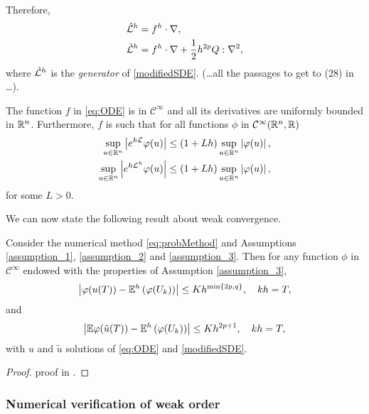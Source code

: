 Therefore,
\begin{equation}
\begin{aligned}
	\hat {\mathcal{L}}^h &= f^h \cdot \nabla, \\
	\tilde {\mathcal{L}}^h &= f^h \cdot \nabla + \frac{1}{2} h^{2p} Q : \nabla^2,
\end{aligned}
\end{equation}
where $\tilde {\mathcal{L}}^h$ is the \textit{generator} of \eqref{modifiedSDE}. (\ldots all the passages to get to (28) in \cite{CGS16} \ldots).
\begin{assumption} \label{assumption_3}The function $f$ in \eqref{eq:ODE} is in $\mathcal C^\infty$ and all its derivatives are uniformly bounded in $\mathbb{R}^n$. Furthermore, $f$ is such that for all functions $\phi$ in $\mathcal C ^\infty(\mathbb{R}^n, \mathbb{R})$ 
\begin{equation}
\begin{aligned}
	\sup_{u\in\mathbb{R}^n} \left| e^{h\mathcal{L}} \varphi(u) \right| &\leq (1 + Lh) \sup_{u\in\mathbb{R}^n} \left|\varphi(u)\right|, \\
	\sup_{u\in\mathbb{R}^n} \left| e^{h\mathcal{L}^h} \varphi(u) \right| &\leq (1 + Lh) \sup_{u\in\mathbb{R}^n} \left|\varphi(u)\right|, \\
\end{aligned}
\end{equation}
for some $L > 0$.
\end{assumption}
\noindent We can now state the following result about weak convergence.
\begin{theorem}\label{thm:weakorder} Consider the numerical method \eqref{eq:probMethod} and Assumptions \ref{assumption_1}, \ref{assumption_2} and \ref{assumption_3}. Then for any function $\phi$ in $\mathcal{C}^\infty$ endowed with the properties of Assumption \ref{assumption_3},
\begin{equation}
	\left|\varphi(u(T)) - \mathbb{E}^h\left(\varphi(U_k)\right)\right| \leq Kh^{\min\{2p, q\}}, \quad kh = T,
\end{equation}
and 
\begin{equation}
\left|\mathbb{E}\varphi(\tilde u(T)) - \mathbb{E}^h\left(\varphi(U_k)\right)\right| \leq Kh^{2p + 1}, \quad kh = T,
\end{equation}
with $u$ and $\tilde u$ solutions of \eqref{eq:ODE} and \eqref{modifiedSDE}.
\end{theorem}
\begin{proof} proof in \cite{CGS16}.
\end{proof}

\subsubsection{Numerical verification of weak order}

